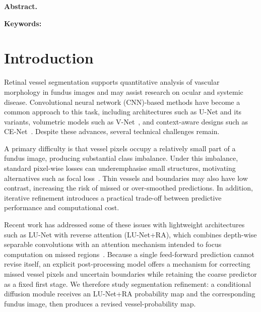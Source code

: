 \documentclass[jimaging,article,submit,pdftex,moreauthors]
  {Definitions/mdpi}
\newif\ifmdpiclass\mdpiclasstrue
\newif\ifmdpiclass\mdpiclassfalse
\begin{document}
\ifmdpiclass
\else
\begin{center}
  {\LARGE\bfseries \papertitle\par}
  \vspace{0.8em}
  {\large \paperauthor\par}
  \vspace{0.6em}
  {\small \paperaddress\par}
  \vspace{0.3em}
  {\small \papercorres\par}
\end{center}
\vspace{0.8em}
\noindent\textbf{Abstract.} \paperabstract\par
\vspace{0.5em}
\noindent\textbf{Keywords:} \paperkeywords\par
\vspace{1em}
\fi



\section{Introduction}

Retinal vessel segmentation supports quantitative analysis of vascular morphology in fundus images and may assist research on ocular and systemic disease. Convolutional neural network (CNN)-based methods have become a common approach to this task, including architectures such as U-Net and its variants, volumetric models such as V-Net~\cite{Milletari2016}, and context-aware designs such as CE-Net~\cite{Gu2019CENet}. Despite these advances, several technical challenges remain.

A primary difficulty is that vessel pixels occupy a relatively small part of a fundus image, producing substantial class imbalance. Under this imbalance, standard pixel-wise losses can underemphasise small structures, motivating alternatives such as focal loss~\cite{Lin2017}. Thin vessels and boundaries may also have low contrast, increasing the risk of missed or over-smoothed predictions. In addition, iterative refinement introduces a practical trade-off between predictive performance and computational cost.

Recent work has addressed some of these issues with lightweight architectures such as LU-Net with reverse attention (LU-Net+RA), which combines depth-wise separable convolutions with an attention mechanism intended to focus computation on missed regions~\cite{Hernandez2025}. Because a single feed-forward prediction cannot revise itself, an explicit post-processing model offers a mechanism for correcting missed vessel pixels and uncertain boundaries while retaining the coarse predictor as a fixed first stage. We therefore study segmentation refinement: a conditional diffusion module receives an LU-Net+RA probability map and the corresponding fundus image, then produces a revised vessel-probability map.
\end{document}
